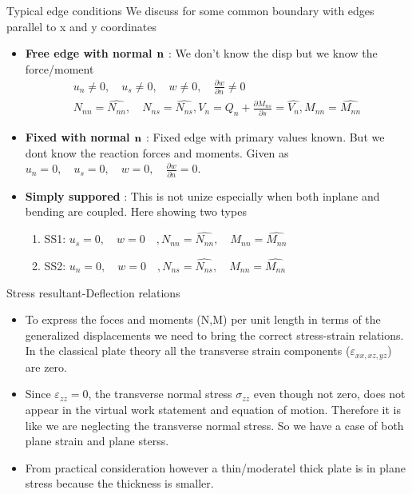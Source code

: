	\begin{frame}{Typical edge conditions}
		We discuss for some common boundary with edges parallel to x and y coordinates
		\begin{itemize}
			\item \textbf{Free edge with normal $\mathbf{n}$} : We don't know the disp but we know the force/moment
			\begin{equation}
				\begin{aligned}
				u_n \neq 0, \quad u_s \neq 0, \quad w \neq 0, \quad \frac{\partial w}{\partial n} \neq 0 \\
				N_{nn} = \hat{N_{nn}}, \quad N_{ns} = \hat{N_{ns}}, V_n =  Q_n + \frac{\partial M_{ns}}{\partial s} = \hat{V_n}, M_{nn} = \hat{M_{nn}}
				\end{aligned}
			\end{equation}
			\item \textbf{Fixed with normal $\mathbf{n}$} : Fixed edge with primary values known. But we dont know the reaction forces and moments. Given as \\
			$u_n =0, \quad u_s =0,\quad w = 0,\quad \frac{\partial w}{\partial n} = 0 $. 
			\item \textbf{Simply suppored} : This is not unize especially when both inplane and bending are coupled. Here showing two types
			\begin{enumerate}
				\item SS1: $u_s = 0, \quad w =0 \quad, N_{nn}=\hat{N_{nn}}, \quad M_{nn} = \hat{M_{nn}}$
				\item SS2: $u_n = 0, \quad w =0 \quad, N_{ns}=\hat{N_{ns}}, \quad M_{nn} = \hat{M_{nn}}$
			\end{enumerate}
			
		\end{itemize}
	\end{frame}


	\begin{frame}{Stress resultant-Deflection relations}
		\begin{itemize}
			\item To express the foces and moments (N,M) per unit length in terms of the generalized displacements we need to bring the correct stress-strain relations. In the classical plate theory all the transverse strain components ($\varepsilon_{xx,xz,yz}$) are zero.
			\item  Since $\varepsilon_{zz} = 0$, the transverse normal stress $\sigma_{zz}$ even though not zero, does not appear in the virtual work statement and equation of motion. Therefore it is like we are neglecting the transverse normal stress. So we have a case of both plane strain and plane sterss.
			\item From practical consideration however a thin/moderatel thick plate is in plane stress because the thickness is smaller.
			
		\end{itemize}
	\end{frame}


